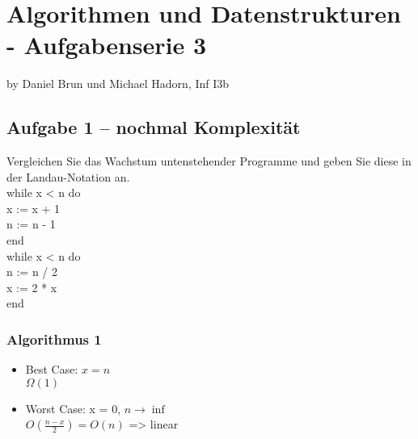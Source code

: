 
\chapter*{Algorithmen und Datenstrukturen - Aufgabenserie 3}
\begin{flushright}
by Daniel Brun und Michael Hadorn, Inf I3b
\end{flushright}
\section*{Aufgabe 1 – nochmal Komplexität}

Vergleichen Sie das Wachstum untenstehender Programme und geben Sie diese in der Landau-Notation an.\\

\noindent
while x < n do\\
	x := x + 1\\
	n := n - 1\\	
end\\

\noindent
while x < n do\\
	n := n / 2\\
	x := 2 * x\\
end\\

\subsection*{Algorithmus 1}

\begin{itemize}
	\item Best Case:  $x = n$ \\
		  $\Omega(1)$
	\item Worst Case: x = 0, $n \rightarrow \inf$ \\
		  $O(\frac{n-x}{2}) = O(n)$ => linear
\end{itemize}

